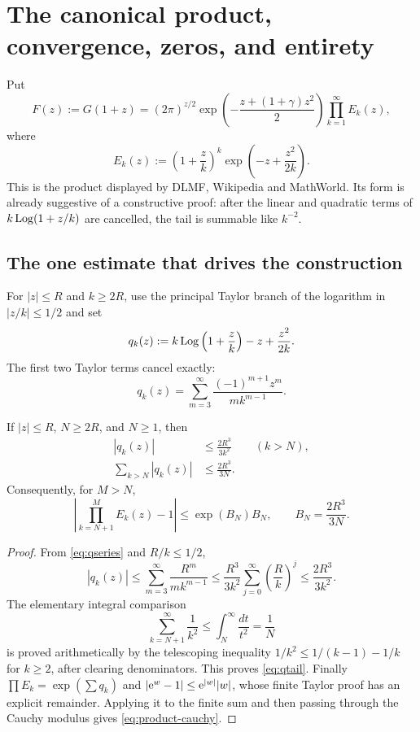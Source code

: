 \section{The canonical product, convergence, zeros, and entirety}\label{sec:product}

Put
\begin{equation}\label{eq:Fdef}
 F(z):=G(1+z)
 =(2\pi)^{z/2}
 \exp\!\left(-\frac{z+(1+\gamma)z^2}{2}\right)
 \prod_{k=1}^{\infty}E_k(z),
\end{equation}
where
\begin{equation}\label{eq:Ek}
 E_k(z):=\left(1+\frac zk\right)^k
          \exp\!\left(-z+\frac{z^2}{2k}\right).
\end{equation}
This is the product displayed by DLMF, Wikipedia and MathWorld.  Its form is
already suggestive of a constructive proof: after the linear and quadratic
terms of \(k\operatorname{Log}(1+z/k)\) are cancelled, the tail is summable like \(k^{-2}\).

\subsection{The one estimate that drives the construction}

For \(|z|\le R\) and \(k\ge 2R\), use the principal Taylor branch of the
logarithm in \(|z/k|\le 1/2\) and set
\[
 q_k(z):=k\operatorname{Log}\left(1+\frac zk\right)-z+\frac{z^2}{2k}.
\]
The first two Taylor terms cancel exactly:
\begin{equation}\label{eq:qseries}
 q_k(z)=\sum_{m=3}^{\infty}
       \frac{(-1)^{m+1}z^m}{m k^{m-1}}.
\end{equation}

\begin{lemma}\label{lem:canonical-tail}
If \(|z|\le R\), \(N\ge 2R\), and \(N\ge1\), then
\begin{align}
 |q_k(z)|&\le \frac{2R^3}{3k^2}\qquad(k>N),\label{eq:qbound}\\
 \sum_{k>N}|q_k(z)|&\le \frac{2R^3}{3N}.
 \label{eq:qtail}
\end{align}
Consequently, for \(M>N\),
\begin{equation}\label{eq:product-cauchy}
 \left|\prod_{k=N+1}^{M}E_k(z)-1\right|
 \le \exp(B_N)B_N,
 \qquad B_N=\frac{2R^3}{3N}.
\end{equation}
\end{lemma}

\begin{proof}
From \cref{eq:qseries} and \(R/k\le1/2\),
\[
 |q_k(z)|
 \le \sum_{m=3}^{\infty}\frac{R^m}{m k^{m-1}}
 \le \frac{R^3}{3k^2}\sum_{j=0}^{\infty}\left(\frac Rk\right)^j
 \le \frac{2R^3}{3k^2}.
\]
The elementary integral comparison
\[
 \sum_{k=N+1}^{\infty}\frac1{k^2}
 \le \int_N^{\infty}\frac{dt}{t^2}=\frac1N
\]
is proved arithmetically by the telescoping inequality
\(
1/k^2\le1/(k-1)-1/k
\)
for \(k\ge2\), after clearing denominators.  This proves
\cref{eq:qtail}.  Finally
\(
\prod E_k=\exp(\sum q_k)
\)
and
\(
|\mathrm e^w-1|\le \mathrm e^{|w|}|w|
\), whose finite Taylor proof has an explicit remainder.  Applying it to the
finite sum and then passing through the Cauchy modulus gives
\cref{eq:product-cauchy}.
\end{proof}

